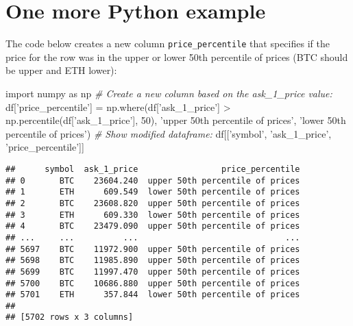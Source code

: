 \documentclass[]{tufte-handout}
\newenvironment{Shaded}{}{}
\newcommand{\CommentTok}[1]{\textcolor[rgb]{0.38,0.63,0.69}{\textit{#1}}}
\newcommand{\DecValTok}[1]{\textcolor[rgb]{0.25,0.63,0.44}{#1}}
\newcommand{\ImportTok}[1]{#1}
\newcommand{\NormalTok}[1]{#1}
\newcommand{\OperatorTok}[1]{\textcolor[rgb]{0.40,0.40,0.40}{#1}}
\newcommand{\StringTok}[1]{\textcolor[rgb]{0.25,0.44,0.63}{#1}}
\begin{document}
\hypertarget{one-more-python-example}{%
\section{One more Python example}\label{one-more-python-example}}

The code below creates a new column \texttt{price\_percentile} that
specifies if the price for the row was in the upper or lower 50th
percentile of prices (BTC should be upper and ETH lower):

\begin{Shaded}
\begin{Highlighting}[]
\ImportTok{import}\NormalTok{ numpy }\ImportTok{as}\NormalTok{ np}
\CommentTok{# Create a new column based on the ask_1_price value:}
\NormalTok{df[}\StringTok{'price_percentile'}\NormalTok{] }\OperatorTok{=}\NormalTok{ np.where(df[}\StringTok{'ask_1_price'}\NormalTok{] }\OperatorTok{>} 
\NormalTok{                                  np.percentile(df[}\StringTok{'ask_1_price'}\NormalTok{], }\DecValTok{50}\NormalTok{),}
                            \StringTok{'upper 50th percentile of prices'}\NormalTok{, }
                            \StringTok{'lower 50th percentile of prices'}\NormalTok{)}
\CommentTok{# Show modified dataframe:}
\NormalTok{df[[}\StringTok{'symbol'}\NormalTok{, }\StringTok{'ask_1_price'}\NormalTok{, }\StringTok{'price_percentile'}\NormalTok{]]}
\end{Highlighting}
\end{Shaded}

\begin{verbatim}
##      symbol  ask_1_price                 price_percentile
## 0       BTC    23604.240  upper 50th percentile of prices
## 1       ETH      609.549  lower 50th percentile of prices
## 2       BTC    23608.820  upper 50th percentile of prices
## 3       ETH      609.330  lower 50th percentile of prices
## 4       BTC    23479.090  upper 50th percentile of prices
## ...     ...          ...                              ...
## 5697    BTC    11972.900  upper 50th percentile of prices
## 5698    BTC    11985.890  upper 50th percentile of prices
## 5699    BTC    11997.470  upper 50th percentile of prices
## 5700    BTC    10686.880  upper 50th percentile of prices
## 5701    ETH      357.844  lower 50th percentile of prices
## 
## [5702 rows x 3 columns]
\end{verbatim}
\end{document}
